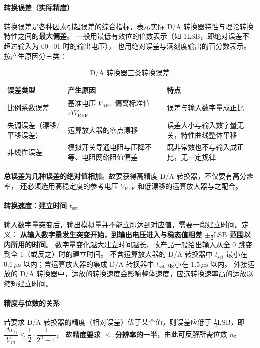 \paragraph{转换误差（实际精度）}
转换误差是各种因素引起误差的综合指标，表示实际 D/A 转换器特性与理论转换特性之间的\textbf{最大偏差}。
一般用最低有效位的倍数表示（如 1LSB，即绝对误差不超过输入为 $00\cdots01$ 时的输出电压），
也用绝对误差与满刻度输出的百分数表示。按产生原因分三类：
\begin{table}[htbp]
\centering
\caption{D/A 转换器三类转换误差}
\begin{tabular}{p{}p{}p{}}
\toprule
误差类型 & 产生原因 & 特点 \\
\midrule
比例系数误差 & 基准电压 $V_\text{REF}$ 偏离标准值 $\Delta V_\text{REF}$ & 误差与输入数字量成正比 \\
失调误差（漂移/平移误差） & 运算放大器的零点漂移 & 误差大小与输入数字量无关，特性曲线整体平移 \\
非线性误差 & 模拟开关导通电阻与压降不等、电阻网络阻值偏差 & 既非常数也不与输入成正比，无一定规律 \\
\bottomrule
\end{tabular}
\end{table}
\textbf{总误差为几种误差的绝对值相加}。故要获得高精度 D/A 转换器，不仅要有高分辨率，
还必须选用高稳定度的参考电压 $V_\text{REF}$ 和低漂移的运算放大器与之配合。

\paragraph{转换速度：建立时间 $t_\text{set}$}
输入数字量突变后，输出模拟量并不能立即达到对应值，需要一段建立时间。定义：
\textbf{从输入数字量发生突变开始，到输出电压进入与稳态值相差 $\pm\frac{1}{2}\text{LSB}$ 范围以内所用的时间}。
数字量变化越大建立时间越长，故产品一般给出输入从全 0 跳变到全 1（或反之）时的建立时间。
不含运算放大器的 D/A 转换器中 $t_\text{set}$ 最小在 $0.1\,\mu\mathrm{s}$ 以内；含运算放大器的集成 D/A 转换器中 $t_\text{set}$ 最小在 $1.5\,\mu\mathrm{s}$ 以内。
外接运放的 D/A 转换器中，运放的转换速度会影响整体速度，应选转换速率高的运放以缩短建立时间。

\paragraph{精度与位数的关系}
若要求 D/A 转换器的精度（相对误差）优于某个值，则误差应低于 $\frac{1}{2}\text{LSB}$，即
$\dfrac{\Delta v_O}{U_m}\le\dfrac{1}{2}\cdot\dfrac{1}{2^n-1}$，
故\textbf{精度要求 $\le$ 分辨率的一半}，由此可反解所需位数 $n$。

